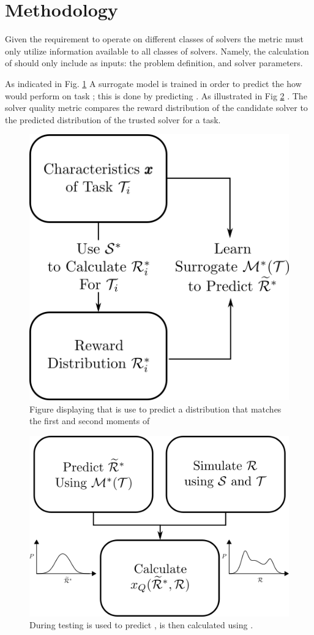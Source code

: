 \section{Methodology}
Given the requirement to operate on different classes of solvers the \xQ{} metric must only utilize information available to all classes of solvers. Namely, the calculation of \xQ{} should only include as inputs: the problem definition, and solver parameters.

As indicated in Fig. \ref{fig:sq_train} A surrogate model \surrogate{} is trained in order to predict the how \solvestar{} would perform on task \task; this is done by predicting \rwdstarapprox. As illustrated in Fig \ref{fig:sq_test} . The solver quality metric compares the reward distribution of the candidate solver to the predicted distribution of the trusted solver for a task.

\begin{figure}[tbp]
    \centering
    \includegraphics[width=0.55\linewidth]{Figures/SQ_train.png}
    \caption{Figure displaying that \surrogate{} is use to predict a distribution  \rwdstariapprox{} that matches the first and second moments of \rwdstari}
    \label{fig:sq_train}
\end{figure}%

\begin{figure}[tbp]
    \centering
    \includegraphics[width=0.6\linewidth]{Figures/SQ_test.png}
    \caption{During testing \surrogate{} is used to predict \rwdstarapprox{}, \xQ{} is then calculated using \rwd{}.}
    \label{fig:sq_test}
\end{figure}

